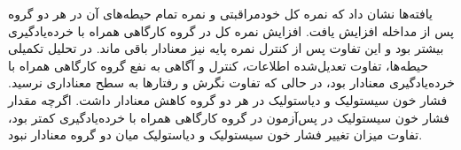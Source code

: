 


یافته‌ها نشان داد که نمره کل خودمراقبتی و نمره تمام حیطه‌های آن در هر دو گروه پس از مداخله افزایش یافت. افزایش نمره کل در گروه کارگاهی همراه با خرده‌یادگیری بیشتر بود و این تفاوت پس از کنترل نمره پایه نیز معنادار باقی ماند. در تحلیل تکمیلی حیطه‌ها، تفاوت تعدیل‌شده اطلاعات، کنترل و آگاهی به نفع گروه کارگاهی همراه با خرده‌یادگیری معنادار بود، در حالی که تفاوت نگرش و رفتارها به سطح معناداری نرسید. فشار خون سیستولیک و دیاستولیک در هر دو گروه کاهش معنادار داشت. اگرچه مقدار فشار خون سیستولیک در پس‌آزمون در گروه کارگاهی همراه با خرده‌یادگیری کمتر بود، تفاوت میزان تغییر فشار خون سیستولیک و دیاستولیک میان دو گروه معنادار نبود.

